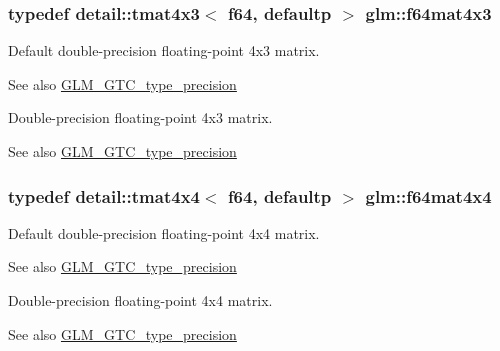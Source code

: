 \subsubsection[{\texorpdfstring{f64mat4x3}{f64mat4x3}}]{\setlength{\rightskip}{0pt plus 5cm}typedef detail\+::tmat4x3$<$ f64, defaultp $>$ {\bf glm\+::f64mat4x3}}\hypertarget{group__gtc__type__precision_gaca283f88500d9895afb939516e7372d1}{}\label{group__gtc__type__precision_gaca283f88500d9895afb939516e7372d1}
Default double-\/precision floating-\/point 4x3 matrix. \begin{DoxySeeAlso}{See also}
\hyperlink{group__gtc__type__precision}{G\+L\+M\+\_\+\+G\+T\+C\+\_\+type\+\_\+precision}
\end{DoxySeeAlso}
Double-\/precision floating-\/point 4x3 matrix. \begin{DoxySeeAlso}{See also}
\hyperlink{group__gtc__type__precision}{G\+L\+M\+\_\+\+G\+T\+C\+\_\+type\+\_\+precision} 
\end{DoxySeeAlso}
\subsubsection[{\texorpdfstring{f64mat4x4}{f64mat4x4}}]{\setlength{\rightskip}{0pt plus 5cm}typedef detail\+::tmat4x4$<$ f64, defaultp $>$ {\bf glm\+::f64mat4x4}}\hypertarget{group__gtc__type__precision_ga37a1ae1f6e67b5a6a06b1ee7c83f4bec}{}\label{group__gtc__type__precision_ga37a1ae1f6e67b5a6a06b1ee7c83f4bec}
Default double-\/precision floating-\/point 4x4 matrix. \begin{DoxySeeAlso}{See also}
\hyperlink{group__gtc__type__precision}{G\+L\+M\+\_\+\+G\+T\+C\+\_\+type\+\_\+precision}
\end{DoxySeeAlso}
Double-\/precision floating-\/point 4x4 matrix. \begin{DoxySeeAlso}{See also}
\hyperlink{group__gtc__type__precision}{G\+L\+M\+\_\+\+G\+T\+C\+\_\+type\+\_\+precision} 
\end{DoxySeeAlso}
